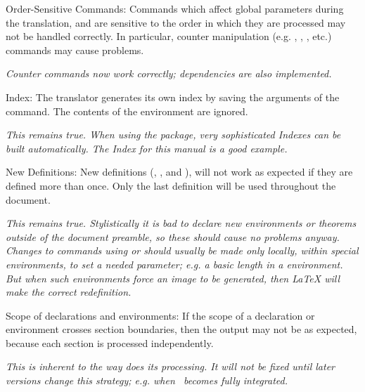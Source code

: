 \begin{htmllist}
\item[Order-Sensitive Commands: ]
Commands which affect global parameters during the translation,
and are sensitive to the order in which they are processed may
not be handled correctly. In particular, counter manipulation
(e.g. , , , etc.)
commands may cause problems.
\begin{changebar}
\newline\textit
{Counter commands now work correctly; dependencies
are also implemented.}
\end{changebar}

\item [Index: ]
The translator generates its own index by saving the arguments  of
the  command. The contents of the 
environment are ignored.
\begin{changebar}
\newline\textit
{This remains true. When using the  package,
very sophisticated Indexes can be built automatically.
The Index for this manual is a good example.}
\end{changebar}

\item[New Definitions:\index{extensions!definitions} ]
New definitions (, ,
 and ),
will not work as expected if they are defined more than once.
Only the last definition will be used throughout the document.
\begin{changebar}
\newline\textit
{This remains true. Stylistically it is bad to declare new
environments or theorems outside of the document preamble,
so these should cause no problems anyway.\html{\\}
Changes to commands using  or 
should usually be made only locally, within special environments,
to set a needed parameter;
e.g. a basic length in a  environment.
But when such environments force an image to be generated,
then \LaTeX{} will make the correct redefinition.}
\end{changebar}

\item [Scope of declarations and environments: ]
If the scope of a declaration or environment crosses section
boundaries, then the output may not be as expected, because each
section is processed independently.
\begin{changebar}
\newline\textit
{This is inherent to the way \latextohtml{} does its processing.
It will not be fixed until later versions change this strategy;
e.g. when \latextohtmlNG\ becomes fully integrated.}
\end{changebar}


\end{htmllist}
